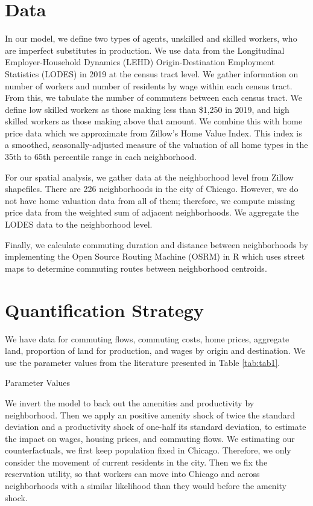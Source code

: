 \documentclass[12pt]{article}
\begin{document}
\section{Data}

In our model, we define two types of agents, unskilled and skilled workers, who are imperfect substitutes in production. We use data from the Longitudinal Employer-Household Dynamics (LEHD) Origin-Destination Employment Statistics (LODES) in 2019 at the census tract level. We gather information on number of workers and number of residents by wage within each census tract. From this, we tabulate the number of commuters between each census tract. We define low skilled workers as those making less than \$1,250 in 2019, and high skilled workers as those making above that amount. We combine this with home price data which we approximate from Zillow's Home Value Index. This index is a smoothed, seasonally-adjusted measure of the valuation of all home types in the 35th to 65th percentile range in each neighborhood. 

For our spatial analysis, we gather data at the neighborhood level from Zillow shapefiles. There are 226 neighborhoods in the city of Chicago. However, we do not have home valuation data from all of them; therefore, we compute missing price data from the weighted sum of adjacent neighborhoods. We aggregate the LODES data to the neighborhood level. 

Finally, we calculate commuting duration and distance between neighborhoods by implementing the Open Source Routing Machine (OSRM) in R which uses street maps to determine commuting routes between neighborhood centroids. 

\section{Quantification Strategy}

We have data for commuting flows, commuting costs, home prices, aggregate land, proportion of land for production, and wages by origin and destination. We use the parameter values from the literature presented in Table \ref{tab:tab1}. 
\begin{table}[h]
    \centering
    \caption{Parameter Values}
    
    \label{tab:tab1}
\end{table}
We invert the model to back out the amenities and productivity by neighborhood. Then we apply an positive amenity shock of twice the standard deviation and a productivity shock of one-half its standard deviation, to estimate the impact on wages, housing prices, and commuting flows. We estimating our counterfactuals, we first keep population fixed in Chicago. Therefore, we only consider the movement of current residents in the city. Then we fix the reservation utility, so that workers can move into Chicago and across neighborhoods with a similar likelihood than they would before the amenity shock. 
\end{document}
